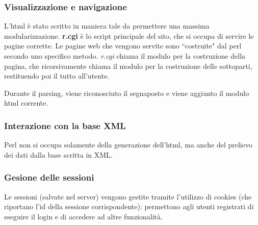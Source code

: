 \subsubsection{Visualizzazione e navigazione}




L'html \`e stato scritto in maniera tale da permettere una massima modularizzazione. \textbf{r.cgi} \`e lo script principale del sito, che si occupa di servire le pagine corrette.
Le pagine web che vengono servite sono ``costruite" dal perl secondo uno specifico metodo. \textit{r.cgi} chiama il modulo per la costruzione della pagina, che ricorsivamente chiama il modulo per la costruzione delle sottoparti, restituendo poi il tutto all'utente.

Durante il parsing, viene riconosciuto il segnaposto e viene aggiunto il modulo html corrente.
\subsubsection{Interazione con la base XML}
Perl non si occupa solamente della generazione dell'html, ma anche del prelievo dei dati dalla base scritta in XML.
\subsubsection{Gesione delle sessioni}
Le sessioni (salvate nel server) vengono gestite tramite l'utilizzo di cookies (che riportano l'id della sessione corrispondente): permettono agli utenti registrati di eseguire il login e di accedere ad altre funzionalit\`a.
